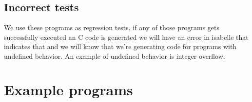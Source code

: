 \subsection{Incorrect tests}
We use these programs as regression tests, if any of those programs gets successfully executed an C code is generated we will have an error in isabelle that indicates that and we will know that we're generating code for programs with undefined behavior.
An example of undefined behavior is integer overflow.

\section{Example programs}
